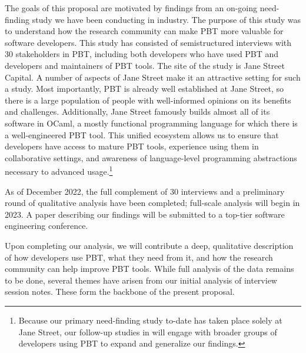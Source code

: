 \label{sec:motivation}
%
The goals of this proposal are motivated by findings from an on-going
need-finding study we have been conducting in industry. The purpose of this 
study was to understand how the research community can make PBT more valuable 
for software developers. This study has consisted of semistructured interviews 
with 30 stakeholders in PBT, including both developers who have used PBT and 
developers and maintainers of PBT tools. The site of the study is Jane Street 
Capital. A number of aspects of Jane Street make it
an attractive setting for such a study.  Most importantly, PBT is
already well established at Jane Street, so there is a large
population of people with well-informed opinions on its benefits and
challenges. Additionally, Jane Street famously builds almost all of its
software in OCaml, a mostly functional programming language for which
there is a well-engineered PBT tool. This unified
ecosystem allows us to ensure that developers have access to mature PBT tools,
experience using them in collaborative settings,
and awareness of language-level programming abstractions necessary
to advanced usage.\footnote{Because our primary need-finding study to-date has 
taken place solely at Jane Street, our follow-up studies in 
 will engage with broader groups of developers using 
PBT to expand and generalize our findings.}

As of December 2022, the full complement of 30 interviews and a
preliminary round of qualitative analysis have been completed; full-scale 
analysis will begin in 2023.  A paper describing our findings will be submitted
to a top-tier software engineering conference.

 Upon completing
our analysis, we will contribute a deep, qualitative description of how 
developers use PBT, what they need from it, and how the research community can 
help improve PBT tools. While full analysis of the data remains
to be done, several themes have arisen from our initial analysis
of interview session notes. These form the backbone of the present proposal.

